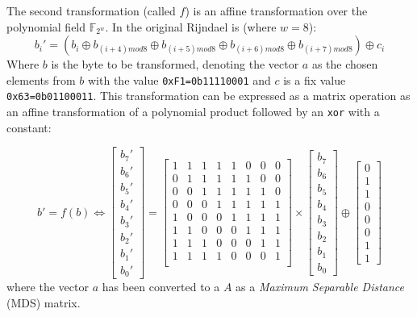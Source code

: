\documentclass[10pt,a4paper,twoside]{llncs}
\newcommand{\Fpn}[2]{\ensuremath{\mathbb{F}_{#1^#2}}}
\begin{document}
The second transformation (called $f$) is an affine transformation over the polynomial field \Fpn{2}{w}. In the original Rijndael is (where $w=8$):
\begin{equation}\label{eq:subBytes:affine}
 b_{i}' = (b_{i} \oplus b_{(i+4)mod8} \oplus b_{(i+5)mod8} \oplus 
          b_{(i+6)mod8} \oplus b_{(i+7)mod8}) \oplus c_{i}
\end{equation}
Where $b$ is the byte to be transformed, denoting the vector $a$ as the chosen elements from $b$ with the value \texttt{0xF1=0b11110001} and $c$ is a fix value \texttt{0x63=0b01100011}. This transformation can be expressed as a matrix operation as an affine transformation of a polynomial product followed by an {\tt xor} with a constant:

\begin{equation}\label{eq:subBytes:matrix}
 b' = f(b)\Longleftrightarrow
 \left[
  \begin{array}{c}
    b_{7}'\\b_{6}'\\b_{5}'\\b_{4}'\\b_{3}'\\b_{2}'\\b_{1}'\\b_{0}'
  \end{array}
 \right]=\left[
  \begin{array}{cccccccc}
    1&1&1&1&1&0&0&0\\
    0&1&1&1&1&1&0&0\\
    0&0&1&1&1&1&1&0\\
    0&0&0&1&1&1&1&1\\
    1&0&0&0&1&1&1&1\\
    1&1&0&0&0&1&1&1\\
    1&1&1&0&0&0&1&1\\
    1&1&1&1&0&0&0&1\\
  \end{array}
 \right]\times\left[
  \begin{array}{c}
    b_{7}\\b_{6}\\b_{5}\\b_{4}\\b_{3}\\b_{2}\\b_{1}\\b_{0}
  \end{array}
 \right]\oplus\left[
  \begin{array}{c}
    0\\1\\1\\0\\0\\0\\1\\1
  \end{array}
 \right]
\end{equation}
where the vector $a$ has been converted to a $A$ as a \emph{Maximum Separable Distance} (MDS) matrix.
\end{document}
